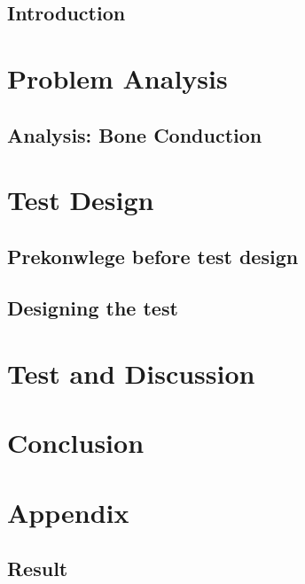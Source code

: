 \glsresetall
 \graphicspath{{figures/analysing/}}
\chapter{Introduction}\label{ch:intro}



\part{Problem Analysis}\label{pt:analysis} \glsresetall
\graphicspath{{figures/analysis/}}
\chapter{Analysis: Bone Conduction}\label{ch:bone_conductors}







\part{Test Design}\label{pt:design} 
\graphicspath{{figures/design/}}	
\chapter{Prekonwlege before test design}\label{ch:test_methopd}




\chapter{Designing the test}\label{ch:test_design}



\part{Test and Discussion}\label{pt:test}
\graphicspath{{figures/tests/}}


 
\part{Conclusion}\label{pt:conclusion}



\glsresetall
\appendix %

 \graphicspath{{figures/appendix/}}
\part{Appendix}\label{pt:appendix}

%
\chapter{Result}


